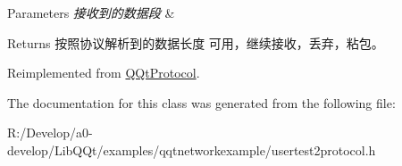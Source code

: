 \begin{DoxyParams}{Parameters}
{\em 接收到的数据段} & \\
\hline
\end{DoxyParams}
\begin{DoxyReturn}{Returns}
按照协议解析到的数据长度 可用，继续接收，丢弃，粘包。 
\end{DoxyReturn}


Reimplemented from \mbox{\hyperlink{class_q_qt_protocol_a00fd0c1ac23379ed3b9b25da9a34f39b}{Q\+Qt\+Protocol}}.



The documentation for this class was generated from the following file\+:\begin{DoxyCompactItemize}
\item 
R\+:/\+Develop/a0-\/develop/\+Lib\+Q\+Qt/examples/qqtnetworkexample/usertest2protocol.\+h\end{DoxyCompactItemize}
